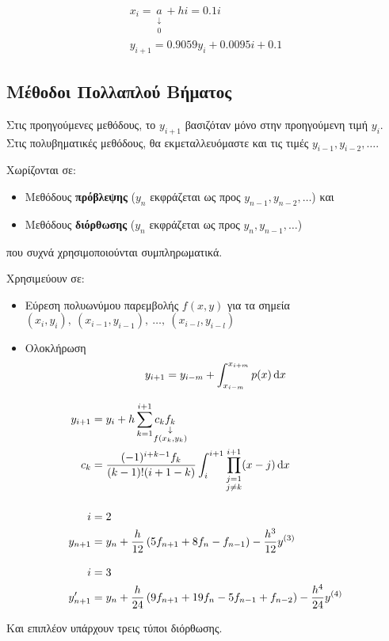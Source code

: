 \documentclass[11pt,a4paper,notitlepage,fleqn]{article}
\begin{document}
\begin{gather*}
	x_i = \underset{\substack{\downarrow\\ 0}}{a}+hi=0.1i \\
	y_{i+1} = 0.9059y_i + 0.0095i + 0.1
\end{gather*}

\subsection{Μέθοδοι Πολλαπλού Βήματος}
Στις προηγούμενες μεθόδους, το \( y_{i+1} \) βασιζόταν μόνο στην
προηγούμενη τιμή \( y_i \). Στις πολυβηματικές μεθόδους, θα
εκμεταλλευόμαστε και τις τιμές \( y_{i-1},y_{i-2},\dots \).

Χωρίζονται σε:
\begin{itemize}
	\item Μεθόδους \textbf{πρόβλεψης} 
	(\( y_n \) εκφράζεται ως προς \( y_{n-1},y_{n-2},\dots \)) και
	\item Μεθόδους \textbf{διόρθωσης}
	(\( y_n \) εκφράζεται ως προς \( y_n,y_{n-1},\dots \))
\end{itemize}
που συχνά χρησιμοποιούνται συμπληρωματικά.

Χρησιμεύουν σε:
\begin{itemize}
	\item Εύρεση πολυωνύμου παρεμβολής \( 
	f(x,y)
	 \) για τα σημεία \( (x_i,y_i),\ (x_{i-1},y_{i-1}),\ \dots,\
	 (x_{i-l},y_{i-l})
	  \)
	\item Ολοκλήρωση
	\[
	y_{i+1} = y_{i-m} + \int_{x_{i-m}}^{x_{i+m}} p(x)\mathop{}\!\mathrm{d} x
	\]
\end{itemize}

\begin{align*}
	y_{i+1} &= y_i +h\sum_{k=1}^{i+1} c_k
	\underset{\substack{\downarrow\\ \mathclap{f(x_k,y_k)}}}{f_k} \\
	c_k &= \frac{(-1)^{i+k-1}f_k}{(k-1)!(i+1-k)}
	\int_{i}^{i+1} \prod_{\substack{j=1\\j\neq k}}^{i+1}
	(x-j)\dif x \\[3ex]
	i &= 2\\
	y_{n+1} &=
	y_n + \frac{h}{12}\left(5f_{n+1}+8f_n-f_{n-1}\right)
	-\frac{h^3}{12}y^{(3)} \\[2ex]
	i &= 3\\
	y_{n+1}' &= y_n+\frac{h}{24}\left(
	9f_{n+1}+19f_n-5f_{n-1}+f_{n-2}
	\right) -\frac{h^4}{24}y^{(4)}
\end{align*}

Και επιπλέον υπάρχουν τρεις τύποι διόρθωσης.
\end{document}

